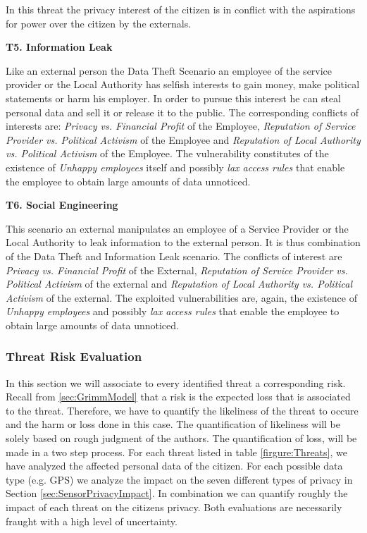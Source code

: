In this threat the privacy interest of the citizen is in conflict with
the aspirations for power over the citizen by the externals.

\textbf{T5. Information Leak}

Like an external person the Data Theft Scenario an employee of the
service provider or the Local Authority has selfish interests to gain
money, make political statements or harm his employer.  In order to
pursue this interest he can steal personal data and sell it or release
it to the public.  The corresponding conflicts of interests are:
\textit{Privacy vs. Financial Profit} of the Employee, \textit{Reputation of Service
  Provider vs. Political Activism} of the Employee and \textit{Reputation of Local
  Authority vs. Political Activism} of the Employee.  The vulnerability constitutes of
the existence of \textit{Unhappy employees} itself and possibly \textit{lax access
rules} that enable the employee to obtain large amounts of data
unnoticed.

\textbf{T6. Social Engineering}

This scenario an external manipulates an employee of a Service
Provider or the Local Authority to leak information to the external
person.  It is thus combination of the Data Theft and Information Leak
scenario.
The conflicts of interest are \textit{Privacy vs. Financial Profit} of
the External, \textit{Reputation of Service Provider vs. Political
  Activism} of the external and \textit{Reputation of Local Authority
  vs. Political Activism} of the external.  The exploited
vulnerabilities are, again, the existence of \textit{Unhappy
  employees} and possibly \textit{lax access rules} that enable the
employee to obtain large amounts of data unnoticed.


\subsubsection{Threat Risk Evaluation}

In this section we will associate to every identified threat a corresponding risk.
Recall from \ref{sec:GrimmModel} that a risk is the expected loss that is associated to the threat.
Therefore, we have to quantify the likeliness of the threat to occure and the harm or loss done in this case.
The quantification of likeliness will be solely based on rough judgment of the authors.
The quantification of loss, will be made in a two step process.
For each threat listed in table \ref{firgure:Threats}, we have analyzed the affected personal data of the citizen.
For each possible data type (e.g. GPS) we analyze the impact on the seven different types of privacy in Section \ref{sec:SensorPrivacyImpact}.
In combination we can quantify roughly the impact of each threat on the citizens privacy. Both evaluations are necessarily fraught with a high level of uncertainty.

